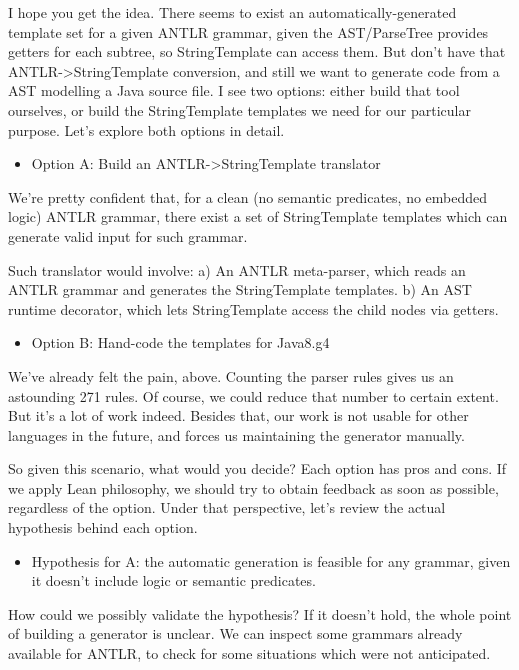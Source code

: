 \documentclass[11pt]{article}
\begin{document}
I hope you get the idea. There seems to exist an automatically-generated template set for a given ANTLR grammar, given the AST/ParseTree
provides getters for each subtree, so StringTemplate can access them.
But don't have that ANTLR->StringTemplate conversion, and still we want to generate code from a AST modelling a Java source file.
I see two options: either build that tool ourselves, or build the StringTemplate templates we need for our particular purpose.
Let's explore both options in detail.

\begin{itemize}
\item Option A: Build an ANTLR->StringTemplate translator
\end{itemize}

We're pretty confident that, for a clean (no semantic predicates, no embedded logic) ANTLR grammar, there exist a
set of StringTemplate templates which can generate valid input for such grammar.

Such translator would involve:
a) An ANTLR meta-parser, which reads an ANTLR grammar and generates the StringTemplate templates.
b) An AST runtime decorator, which lets StringTemplate access the child nodes via getters.

\begin{itemize}
\item Option B: Hand-code the templates for Java8.g4
\end{itemize}

We've already felt the pain, above. Counting the parser rules gives us an astounding 271 rules. Of course, we could
reduce that number to certain extent. But it's a lot of work indeed. Besides that, our work is not usable for other languages
in the future, and forces us maintaining the generator manually.

So given this scenario, what would you decide? Each option has pros and cons. If we apply Lean philosophy, we should try to
obtain feedback as soon as possible, regardless of the option. Under that perspective, let's review the actual hypothesis behind
each option.

\begin{itemize}
\item Hypothesis for A: the automatic generation is feasible for any grammar, given it doesn't include logic or semantic predicates.
\end{itemize}

How could we possibly validate the hypothesis? If it doesn't hold, the whole point of building a generator is unclear. We can inspect
some grammars already available for ANTLR, to check for some situations which were not anticipated.
\end{document}
